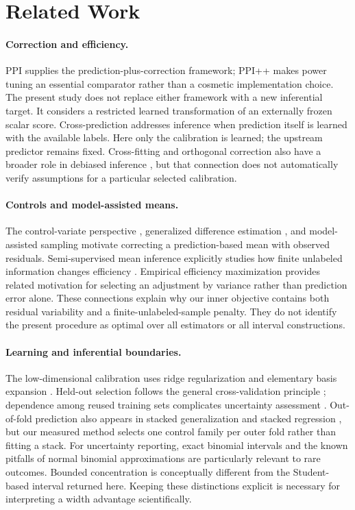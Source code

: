 \documentclass{article}
\begin{document}
\section{Related Work}
\paragraph{Correction and efficiency.}
PPI \citep{PPI} supplies the prediction-plus-correction framework; PPI++ \citep{PPIPlus} makes power tuning an essential comparator rather than a cosmetic implementation choice. The present study does not replace either framework with a new inferential target. It considers a restricted learned transformation of an externally frozen scalar score. Cross-prediction \citep{CrossPPI} addresses inference when prediction itself is learned with the available labels. Here only the calibration is learned; the upstream predictor remains fixed. Cross-fitting and orthogonal correction also have a broader role in debiased inference \citep{DML}, but that connection does not automatically verify assumptions for a particular selected calibration.

\paragraph{Controls and model-assisted means.}
The control-variate perspective \citep{Glynn}, generalized difference estimation \citep{Cassel}, and model-assisted sampling \citep{Sarndal} motivate correcting a prediction-based mean with observed residuals. Semi-supervised mean inference explicitly studies how finite unlabeled information changes efficiency \citep{Zhang}. Empirical efficiency maximization \citep{Rubin} provides related motivation for selecting an adjustment by variance rather than prediction error alone. These connections explain why our inner objective contains both residual variability and a finite-unlabeled-sample penalty. They do not identify the present procedure as optimal over all estimators or all interval constructions.

\paragraph{Learning and inferential boundaries.}
The low-dimensional calibration uses ridge regularization \citep{Hoerl} and elementary basis expansion \citep{Hastie}. Held-out selection follows the general cross-validation principle \citep{Stone}; dependence among reused training sets complicates uncertainty assessment \citep{Nadeau}. Out-of-fold prediction also appears in stacked generalization and stacked regression \citep{Wolpert,Breiman}, but our measured method selects one control family per outer fold rather than fitting a stack. For uncertainty reporting, exact binomial intervals \citep{ClopperPearson} and the known pitfalls of normal binomial approximations \citep{Brown} are particularly relevant to rare outcomes. Bounded concentration \citep{Hoeffding,MaurerPontil} is conceptually different from the Student-based interval returned here. Keeping these distinctions explicit is necessary for interpreting a width advantage scientifically.
\end{document}
